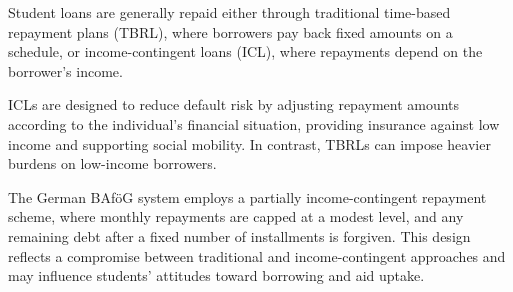 Student loans are generally repaid either through traditional time-based repayment plans (TBRL), where borrowers pay back fixed amounts on a schedule, or income-contingent loans (ICL), where repayments depend on the borrower’s income. 

ICLs are designed to reduce default risk by adjusting repayment amounts according to the individual’s financial situation, providing insurance against low income and supporting social mobility. In contrast, TBRLs can impose heavier burdens on low-income borrowers.

The German BAföG system employs a partially income-contingent repayment scheme, where monthly repayments are capped at a modest level, and any remaining debt after a fixed number of installments is forgiven. This design reflects a compromise between traditional and income-contingent approaches and may influence students’ attitudes toward borrowing and aid uptake.

